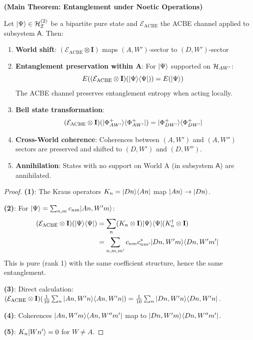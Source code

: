 \begin{theorem}
\label{thm:acbe-entanglement}
\textbf{(Main Theorem: Entanglement under Noetic Operations)}

Let $|\Psi\rangle \in \mathcal{H}_{\mathcal{I}}^{(2)}$ be a bipartite pure state and $\mathcal{E}_{\mathrm{ACBE}}$ the ACBE channel applied to subsystem $\mathsf{A}$. Then:

\begin{enumerate}
  \item \textbf{World shift}: $(\mathcal{E}_{\mathrm{ACBE}} \otimes \mathbf{I})$ maps $(A, W')$-sector to $(D, W')$-sector

  \item \textbf{Entanglement preservation within A}: For $|\Psi\rangle$ supported on $\mathcal{H}_{AW'}$:
  \[
  E((\mathcal{E}_{\mathrm{ACBE}} \otimes \mathbf{I})(|\Psi\rangle\langle \Psi|)) = E(|\Psi\rangle)
  \]
  The ACBE channel preserves entanglement entropy when acting locally.

  \item \textbf{Bell state transformation}:
  \[
  (\mathcal{E}_{\mathrm{ACBE}} \otimes \mathbf{I})(|\Phi^+_{AW'}\rangle\langle \Phi^+_{AW'}|) = |\Phi^+_{DW'}\rangle\langle \Phi^+_{DW'}|
  \]

  \item \textbf{Cross-World coherence}: Coherences between $(A, W')$ and $(A, W'')$ sectors are preserved and shifted to $(D, W')$ and $(D, W'')$.

  \item \textbf{Annihilation}: States with no support on World A (in subsystem $\mathsf{A}$) are annihilated.
\end{enumerate}
\end{theorem}

\begin{proof}
\textbf{(1)}: The Kraus operators $K_n = |Dn\rangle\langle An|$ map $|An\rangle \to |Dn\rangle$.

\textbf{(2)}: For $|\Psi\rangle = \sum_{n,m} c_{nm} |An, W'm\rangle$:
\begin{align}
(\mathcal{E}_{\mathrm{ACBE}} \otimes \mathbf{I})(|\Psi\rangle\langle \Psi|) &= \sum_{n} (K_n \otimes \mathbf{I}) |\Psi\rangle\langle \Psi| (K_n^\dagger \otimes \mathbf{I}) \\
&= \sum_{n,m,m'} c_{nm} c_{nm'}^* |Dn, W'm\rangle\langle Dn, W'm'|
\end{align}
This is pure (rank 1) with the same coefficient structure, hence the same entanglement.

\textbf{(3)}: Direct calculation: $(\mathcal{E}_{\mathrm{ACBE}} \otimes \mathbf{I})(\frac{1}{10}\sum_n |An, W'n\rangle\langle An, W'n|) = \frac{1}{10}\sum_n |Dn, W'n\rangle\langle Dn, W'n|$.

\textbf{(4)}: Coherences $|An, W'm\rangle\langle An, W''m'|$ map to $|Dn, W'm\rangle\langle Dn, W''m'|$.

\textbf{(5)}: $K_n |Wn'\rangle = 0$ for $W \neq A$.
\end{proof}

